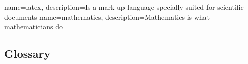 
\renewcommand{\glossarysection}[2][]{}

{
    name=latex,
    description={Is a mark up language specially suited
    for scientific documents}
}
{
    name=mathematics,
    description={Mathematics is what mathematicians do}
}

\glsaddall
\subsection{Glossary}
\printglossaries
